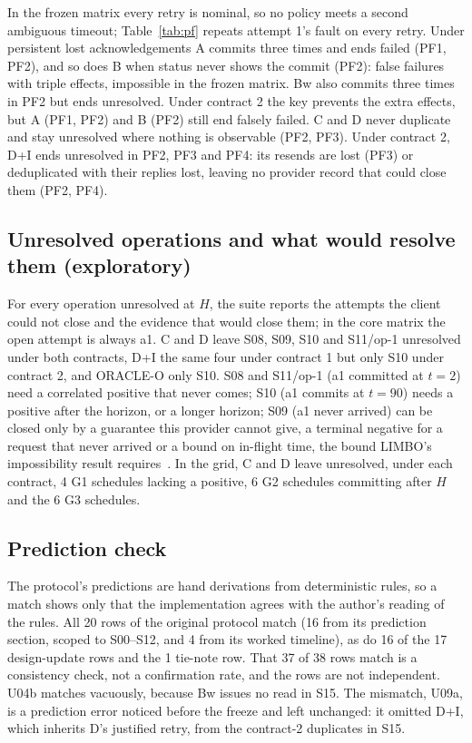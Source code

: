 \documentclass[11pt]{article}
\begin{document}
In the frozen matrix every retry is nominal, so no policy meets a second ambiguous timeout; Table~\ref{tab:pf} repeats attempt 1's fault on every retry. Under persistent lost acknowledgements A commits three times and ends failed (PF1, PF2), and so does B when status never shows the commit (PF2): false failures with triple effects, impossible in the frozen matrix. Bw also commits three times in PF2 but ends unresolved. Under contract 2 the key prevents the extra effects, but A (PF1, PF2) and B (PF2) still end falsely failed. C and D never duplicate and stay unresolved where nothing is observable (PF2, PF3). Under contract 2, D+I ends unresolved in PF2, PF3 and PF4: its resends are lost (PF3) or deduplicated with their replies lost, leaving no provider record that could close them (PF2, PF4).

\subsection{Unresolved operations and what would resolve them (exploratory)}\label{sec:escalation}

For every operation unresolved at $H$, the suite reports the attempts the client could not close and the evidence that would close them; in the core matrix the open attempt is always a1. C and D leave S08, S09, S10 and S11/op-1 unresolved under both contracts, D+I the same four under contract 1 but only S10 under contract 2, and ORACLE-O only S10. S08 and S11/op-1 (a1 committed at $t=2$) need a correlated positive that never comes; S10 (a1 commits at $t=90$) needs a positive after the horizon, or a longer horizon; S09 (a1 never arrived) can be closed only by a guarantee this provider cannot give, a terminal negative for a request that never arrived or a bound on in-flight time, the bound LIMBO's impossibility result requires~\cite{limbo}. In the grid, C and D leave unresolved, under each contract, 4 G1 schedules lacking a positive, 6 G2 schedules committing after $H$ and the 6 G3 schedules.

\subsection{Prediction check}\label{sec:predictions}

The protocol's predictions are hand derivations from deterministic rules, so a match shows only that the implementation agrees with the author's reading of the rules. All 20 rows of the original protocol match (16 from its prediction section, scoped to S00--S12, and 4 from its worked timeline), as do 16 of the 17 design-update rows and the 1 tie-note row. That 37 of 38 rows match is a consistency check, not a confirmation rate, and the rows are not independent. U04b matches vacuously, because Bw issues no read in S15. The mismatch, U09a, is a prediction error noticed before the freeze and left unchanged: it omitted D+I, which inherits D's justified retry, from the contract-2 duplicates in S15.
\end{document}
